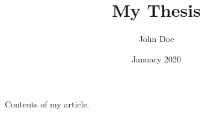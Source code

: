 \documentclass[11pt]{article}
\title{My Thesis}
\author{John Doe}
\date{January 2020}
\begin{document}
\maketitle

Contents of my article.


% 
% 
\end{document}
